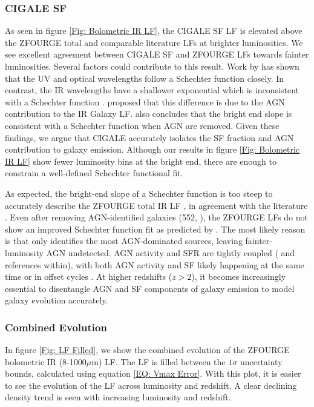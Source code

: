 \subsubsection{CIGALE SF}
As seen in figure \ref{Fig: Bolometric IR LF}, the CIGALE SF LF is elevated above the ZFOURGE total and comparable literature LFs at brighter luminosities. We see excellent agreement between CIGALE SF and ZFOURGE LFs towards fainter luminosities. Several factors could contribute to this result. Work by \cite{wu_mid-infrared_2011} has shown that the UV and optical wavelengths follow a Schechter function closely. In contrast, the IR wavelengths have a shallower exponential which is inconsistent with a Schechter function \citep{symeonidis_what_2019}. \cite{fu_decomposing_2010} proposed that this difference is due to the AGN contribution to the IR Galaxy LF. \cite{wu_mid-infrared_2011} also concludes that the bright end slope is consistent with a Schechter function when AGN are removed. Given these findings, we argue that CIGALE accurately isolates the SF fraction and AGN contribution to galaxy emission. Although our results in figure \ref{Fig: Bolometric IR LF} show fewer luminosity bins at the bright end, there are enough to constrain a well-defined Schechter functional fit.

As expected, the bright-end slope of a Schechter function is too steep to accurately describe the ZFOURGE total IR LF \citep{wu_mid-infrared_2011}, in agreement with the literature \citep{rodighiero_mid-_2010, gruppioni_herschel_2013, symeonidis_what_2019}. Even after removing AGN-identified galaxies (552, \citealp{cowley_zfourge_2016}), the ZFOURGE LFs do not show an improved Schechter function fit as predicted by \cite{fu_decomposing_2010, wu_mid-infrared_2011}. The most likely reason is that \cite{cowley_zfourge_2016} only identifies the most AGN-dominated sources, leaving fainter-luminosity AGN undetected. AGN activity and SFR are tightly coupled (\citealp{alexander_what_2012} and references within), with both AGN activity and SF likely happening at the same time or in offset cycles \citep{cowley_decoupled_2018}. At higher redshifts ($z > 2$), it becomes increasingly essential to disentangle AGN and SF components of galaxy emission to model galaxy evolution accurately.

\subsubsection{Combined Evolution}
In figure \ref{Fig: LF Filled}, we show the combined evolution of the ZFOURGE bolometric IR (8-1000$\mu$m) LF. The LF is filled between the $1\sigma$ uncertainty bounds, calculated using equation \ref{EQ: Vmax Error}. With this plot, it is easier to see the evolution of the LF across luminosity and redshift. A clear declining density trend is seen with increasing luminosity and redshift.

